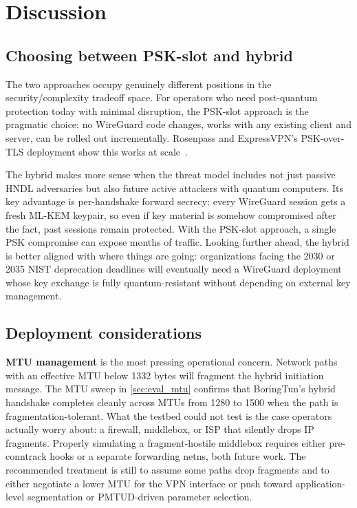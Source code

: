 \documentclass[11pt,a4paper]{article}
\begin{document}
\section{Discussion}
\label{sec:discussion}

\subsection{Choosing between PSK-slot and hybrid}

The two approaches occupy genuinely different positions in the security/complexity tradeoff space. For operators who need post-quantum protection today with minimal disruption, the PSK-slot approach is the pragmatic choice: no WireGuard code changes, works with any existing client and server, can be rolled out incrementally. Rosenpass and ExpressVPN's PSK-over-TLS deployment show this works at scale~\cite{rosenpass,membrey2025expressvpn}.

The hybrid makes more sense when the threat model includes not just passive HNDL adversaries but also future active attackers with quantum computers. Its key advantage is per-handshake forward secrecy: every WireGuard session gets a fresh ML-KEM keypair, so even if key material is somehow compromised after the fact, past sessions remain protected. With the PSK-slot approach, a single PSK compromise can expose months of traffic. Looking further ahead, the hybrid is better aligned with where things are going: organizations facing the 2030 or 2035 NIST deprecation deadlines will eventually need a WireGuard deployment whose key exchange is fully quantum-resistant without depending on external key management.

\subsection{Deployment considerations}

\textbf{MTU management} is the most pressing operational concern. Network paths with an effective MTU below 1332 bytes will fragment the hybrid initiation message. The MTU sweep in \cref{sec:eval_mtu} confirms that BoringTun's hybrid handshake completes cleanly across MTUs from 1280 to 1500 when the path is fragmentation-tolerant. What the testbed could not test is the case operators actually worry about: a firewall, middlebox, or ISP that silently drops IP fragments. Properly simulating a fragment-hostile middlebox requires either pre-conntrack hooks or a separate forwarding netns, both future work. The recommended treatment is still to assume some paths drop fragments and to either negotiate a lower MTU for the VPN interface or push toward application-level segmentation or PMTUD-driven parameter selection.
\end{document}
